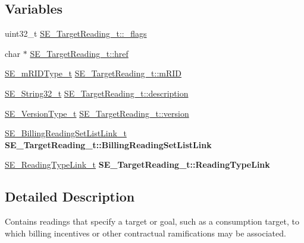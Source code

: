 \subsection*{Variables}
\begin{DoxyCompactItemize}
\item 
uint32\+\_\+t \hyperlink{group__TargetReading_gaaf344e38f87e901981538342c80f3d6f}{S\+E\+\_\+\+Target\+Reading\+\_\+t\+::\+\_\+flags}
\item 
char $\ast$ \hyperlink{group__TargetReading_gaea2bf3a76c988bc1e063e3230087b17e}{S\+E\+\_\+\+Target\+Reading\+\_\+t\+::href}
\item 
\hyperlink{group__mRIDType_gac74622112f3a388a2851b2289963ba5e}{S\+E\+\_\+m\+R\+I\+D\+Type\+\_\+t} \hyperlink{group__TargetReading_gaba82706ff98671daae1c9e06ee1e0d12}{S\+E\+\_\+\+Target\+Reading\+\_\+t\+::m\+R\+ID}
\item 
\hyperlink{group__String32_gac9f59b06b168b4d2e0d45ed41699af42}{S\+E\+\_\+\+String32\+\_\+t} \hyperlink{group__TargetReading_gab528105e52e927d416310936aefb3b49}{S\+E\+\_\+\+Target\+Reading\+\_\+t\+::description}
\item 
\hyperlink{group__VersionType_ga4b8d27838226948397ed99f67d46e2ae}{S\+E\+\_\+\+Version\+Type\+\_\+t} \hyperlink{group__TargetReading_gae96ed0578c2f7248515997778cee5da8}{S\+E\+\_\+\+Target\+Reading\+\_\+t\+::version}
\item 
\mbox{\label{group__TargetReading_gaf811fbd86370bd8226e0b8fd0bec9072}} 
\hyperlink{structSE__BillingReadingSetListLink__t}{S\+E\+\_\+\+Billing\+Reading\+Set\+List\+Link\+\_\+t} {\bfseries S\+E\+\_\+\+Target\+Reading\+\_\+t\+::\+Billing\+Reading\+Set\+List\+Link}
\item 
\mbox{\label{group__TargetReading_ga3d0ec88707fed30dc0aa6d1f8d94ff70}} 
\hyperlink{structSE__ReadingTypeLink__t}{S\+E\+\_\+\+Reading\+Type\+Link\+\_\+t} {\bfseries S\+E\+\_\+\+Target\+Reading\+\_\+t\+::\+Reading\+Type\+Link}
\end{DoxyCompactItemize}


\subsection{Detailed Description}
Contains readings that specify a target or goal, such as a consumption target, to which billing incentives or other contractual ramifications may be associated. 

